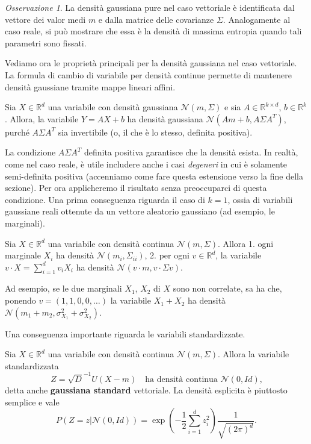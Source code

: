 \documentclass[
  italian,
  letterpaper,
]{book}
\newcommand{\bra}[1]{\left( #1 \right)}
\newcommand{\R}{\mathbb{R}}
\theoremstyle{definition}
\theoremstyle{remark}
\newtheorem*{remark}{Osservazione}
\begin{document}
\begin{remark}
La densità gaussiana pure nel caso vettoriale è identificata dal vettore
dei valor medi \(m\) e dalla matrice delle covarianze \(\Sigma\).
Analogamente al caso reale, si può mostrare che essa è la densità di
massima entropia quando tali parametri sono fissati.
\end{remark}

Vediamo ora le proprietà principali per la densità gaussiana nel caso
vettoriale. La formula di cambio di variabile per densità continue
permette di mantenere densità gaussiane tramite mappe lineari affini.

Sia \(X \in \R^d\) una variabile con densità gaussiana
\(\mathcal{N}(m,\Sigma)\) e sia \(A \in \R^{k\times d}\),
\(b \in \R^k\). Allora, la variabile \(Y = AX+b\) ha densità gaussiana
\(\mathcal{N}(Am+b, A \Sigma A^T)\), purché \(A \Sigma A^T\) sia
invertibile (o, il che è lo stesso, definita positiva).

La condizione \(A \Sigma A^T\) definita positiva garantisce che la
densità esista. In realtà, come nel caso reale, è utile includere anche
i casi \emph{degeneri} in cui è solamente semi-definita positiva
(accenniamo come fare questa estensione verso la fine della sezione).
Per ora applicheremo il risultato senza preoccuparci di questa
condizione. Una prima conseguenza riguarda il caso di \(k=1\), ossia di
variabili gaussiane reali ottenute da un vettore aleatorio gaussiano (ad
esempio, le marginali).

Sia \(X \in \R^d\) una variabile con densità continua
\(\mathcal{N}(m, \Sigma)\). Allora 1. ogni marginale \(X_i\) ha densità
\(\mathcal{N}(m_i, \Sigma_{ii})\), 2. per ogni \(v \in \R^d\), la
variabile \(v \cdot X = \sum_{i=1}^d v_i X_i\) ha densità
\(\mathcal{N}(v \cdot m, v \cdot \Sigma v)\).

Ad esempio, se le due marginali \(X_1\), \(X_2\) di \(X\) sono non
correlate, sa ha che, ponendo \(v = (1,1,0,0,\ldots)\) la variabile
\(X_1+X_2\) ha densità
\(\mathcal{N}(m_1+m_2, \sigma_{X_1}^2 + \sigma_{X_2}^2)\).

Una conseguenza importante riguarda le variabili standardizzate.

Sia \(X \in \R^d\) una variabile con densità continua
\(\mathcal{N}(m, \Sigma)\). Allora la variabile standardizzata
\[ Z = \sqrt{D}^{-1} U (X-m) \quad \text{ha densità continua $\mathcal{N}(0, Id)$,}\]
detta anche \textbf{gaussiana standard} vettoriale. La densità esplicita
è piuttosto semplice e vale
\[ P(Z= z |  \mathcal{N}(0, Id)) = \exp\bra{ - \frac1 2 \sum_{i=1}^d z_i^2 }  \frac{1}{\sqrt{ (2 \pi)^d}}. \]
\end{document}

